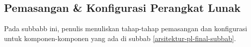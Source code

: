   \subsection{Pemasangan \& Konfigurasi Perangkat Lunak}
	  Pada subbabb ini, penulis menuliskan tahap-tahap pemasangan dan konfigurasi untuk komponen-komponen yang ada di subbab \ref{arsitektur-pl-final-subbab}.
	  
	
	
	
	
	
	
	
	
	
	
	
	 
  
  
  
  
  
  
